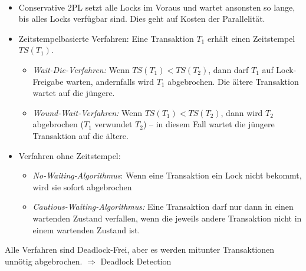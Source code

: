 \begin{frame}{\insertsection}
	\framesubtitle{\insertsubsection}
\begin{itemize}
\item Conservative 2PL setzt alle Locks im Voraus und wartet ansonsten so lange, bis alles Locks verfügbar sind. Dies geht auf Kosten der Parallelität.
\item Zeitstempelbasierte Verfahren: Eine Transaktion $T_1$ erhält einen Zeitstempel $TS(T_1)$. 
\begin{itemize}
\item \textit{Wait-Die-Verfahren:} Wenn $TS(T_1)<TS(T_2)$, dann darf $T_1$ auf Lock-Freigabe warten, andernfalls wird $T_1$ abgebrochen. Die ältere Transaktion wartet auf die jüngere.
\item \textit{Wound-Wait-Verfahren:} Wenn $TS(T_1)<TS(T_2)$, dann wird $T_2$ abgebrochen ($T_1$ verwundet $T_2$) -- in diesem Fall wartet die jüngere Transaktion auf die ältere.
\end{itemize}
\item Verfahren ohne Zeitstempel: 
\begin{itemize}
\item \textit{No-Waiting-Algorithmus}: Wenn eine Transaktion ein Lock nicht bekommt, wird sie sofort abgebrochen
\item \textit{Cautious-Waiting-Algorithmus:} Eine Transaktion darf nur dann in einen wartenden Zustand verfallen, wenn die jeweils andere Transaktion nicht in einem wartenden Zustand ist. 
\end{itemize}
\end{itemize}
\alert{Alle Verfahren sind Deadlock-Frei, aber es werden mitunter Transaktionen unnötig abgebrochen. $\Rightarrow$ Deadlock Detection} 
\end{frame}

